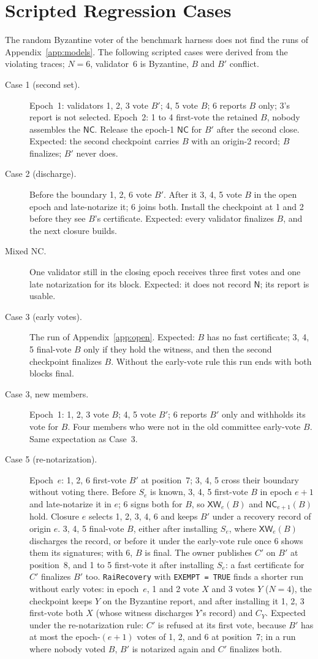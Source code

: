 \documentclass[conference]{IEEEtran}
\newcommand{\NC}{\mathsf{NC}}
\newcommand{\XW}{\mathsf{XW}}
\newcommand{\tagN}{\mathsf{N}}
\begin{document}
\section{Scripted Regression Cases}
\label{app:cases}
The random Byzantine voter of the benchmark harness does not find the runs of Appendix~\ref{app:models}. The following scripted cases were derived from the violating traces; $N=6$, validator~6 is Byzantine, $B$ and $B'$ conflict.
\begin{description}
\item[Case 1 (second set).] Epoch~1: validators 1, 2, 3 vote $B'$; 4, 5 vote $B$; 6 reports $B$ only; 3's report is not selected. Epoch~2: 1 to 4 first-vote the retained $B$, nobody assembles the $\NC$. Release the epoch-1 $\NC$ for $B'$ after the second close. Expected: the second checkpoint carries $B$ with an origin-2 record; $B$ finalizes; $B'$ never does.
\item[Case 2 (discharge).] Before the boundary 1, 2, 6 vote $B'$. After it 3, 4, 5 vote $B$ in the open epoch and late-notarize it; 6 joins both. Install the checkpoint at 1 and 2 before they see $B$'s certificate. Expected: every validator finalizes $B$, and the next closure builds.
\item[Mixed NC.] One validator still in the closing epoch receives three first votes and one late notarization for its block. Expected: it does not record $\tagN$; its report is usable.
\item[Case 3 (early votes).] The run of Appendix~\ref{app:open}. Expected: $B$ has no fast certificate; 3, 4, 5 final-vote $B$ only if they hold the witness, and then the second checkpoint finalizes $B$. Without the early-vote rule this run ends with both blocks final.
\item[Case 3, new members.] Epoch~1: 1, 2, 3 vote $B$; 4, 5 vote $B'$; 6 reports $B'$ only and withholds its vote for $B$. Four members who were not in the old committee early-vote $B$. Same expectation as Case~3.
\item[Case 5 (re-notarization).] Epoch~$e$: 1, 2, 6 first-vote $B'$ at position~7; 3, 4, 5 cross their boundary without voting there. Before $S_e$ is known, 3, 4, 5 first-vote $B$ in epoch $e+1$ and late-notarize it in $e$; 6 signs both for $B$, so $\XW_e(B)$ and $\NC_{e+1}(B)$ hold. Closure $e$ selects 1, 2, 3, 4, 6 and keeps $B'$ under a recovery record of origin $e$. 3, 4, 5 final-vote $B$, either after installing $S_e$, where $\XW_e(B)$ discharges the record, or before it under the early-vote rule once 6 shows them its signatures; with 6, $B$ is final. The owner publishes $C'$ on $B'$ at position~8, and 1 to 5 first-vote it after installing $S_e$: a fast certificate for $C'$ finalizes $B'$ too. \texttt{RaiRecovery} with \texttt{EXEMPT = TRUE} finds a shorter run without early votes: in epoch~$e$, 1 and 2 vote $X$ and 3 votes $Y$ ($N=4$), the checkpoint keeps $Y$ on the Byzantine report, and after installing it 1, 2, 3 first-vote both $X$ (whose witness discharges $Y$'s record) and $C_Y$. Expected under the re-notarization rule: $C'$ is refused at its first vote, because $B'$ has at most the epoch-$(e+1)$ votes of 1, 2, and 6 at position~7; in a run where nobody voted $B$, $B'$ is notarized again and $C'$ finalizes both.

\end{description}
\end{document}
